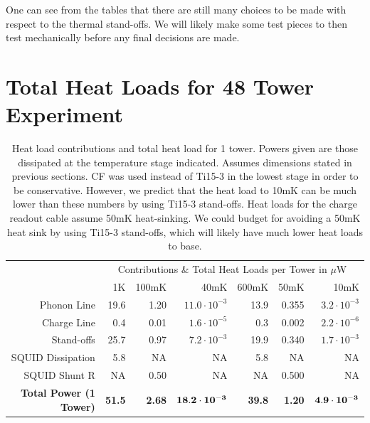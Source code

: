 \documentclass{article}
\begin{document}
One can see from the tables that there are still many choices to be made with respect to the thermal stand-offs. We will likely make some test pieces to then test mechanically before any final decisions are made.

\newpage
\section{Total Heat Loads for 48 Tower Experiment}
\begin{table}[h]
\begin{threeparttable}
\begin{tabular}{rrrr|rrr}
\toprule
 & \multicolumn{6}{c}{Contributions \& Total Heat Loads per Tower in $\mu$W} \\
  & 1K & 100mK & 40mK & 600mK & 50mK & 10mK \\
 \cmidrule(r){2-7}
   Phonon Line & 19.6 & 1.20 & $11.0 \cdot 10^{-3}$  & 13.9 & 0.355 & $3.2 \cdot 10^{-3}$ \\
   Charge Line & 0.4 & 0.01 & $1.6 \cdot 10^{-5} $ & 0.3 & 0.002  & $2.2 \cdot 10^{-6}$ \\
   Stand-offs & 25.7 & 0.97 & $7.2 \cdot 10^{-3}$ & 19.9 & 0.340 & $1.7 \cdot 10^{-3}$ \\
   SQUID Dissipation & 5.8 & NA & NA & 5.8 & NA & NA \\
   SQUID Shunt R & NA & 0.50 & NA & NA & 0.500 & NA \\
   \bf{Total Power (1 Tower)} & \bf{51.5} & \bf{2.68} & $ \bf{18.2 \cdot 10^{-3}}$ & \bf{39.8} & \bf{1.20} & $\bf{4.9 \cdot 10^{-3}}$ \\
  \bottomrule
\end{tabular}
\end{threeparttable}
\caption{Heat load contributions and total heat load for 1 tower. Powers given are those dissipated at the temperature stage indicated. Assumes dimensions stated in previous sections. CF was used instead of Ti15-3 in the lowest stage in order to be conservative. However, we predict that the heat load to 10mK can be much lower than these numbers by using Ti15-3 stand-offs. Heat loads for the charge readout cable assume 50mK heat-sinking. We could budget for avoiding a 50mK heat sink by using Ti15-3 stand-offs, which will likely have much lower heat loads to base. }
\end{table}
\end{document}
